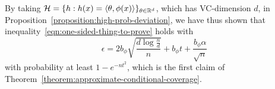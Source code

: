 \documentclass{article}
\newcommand{\radphi}{b_{\phi}}
\newcommand{\scorerv}{S}
\begin{document}
By taking $\mathcal{H} = \{h : h(x) = \langle\theta, \phi(x)\rangle\}_{\theta \in \mathbb{R}^d}$,
which has VC-dimension $d$, in
Proposition~\ref{proposition:high-prob-deviation}, we have thus shown that
inequality~\eqref{eqn:one-sided-thing-to-prove} holds with
\begin{equation*}
  \epsilon = 
  2 \radphi \sqrt{\frac{d \log \frac{n}{d}}{n}} + \radphi t
  + \frac{\radphi \alpha}{\sqrt{n}}
\end{equation*}
with
probability at least $1 - e^{-nt^2}$, which is the first claim of
Theorem~\ref{theorem:approximate-conditional-coverage}.

\end{document}
